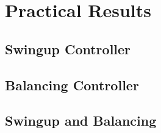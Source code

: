 \chapter{Practical Results}
\label{chp:prac_results}







\section{Swingup Controller}
\section{Balancing Controller}
\section{Swingup and Balancing}